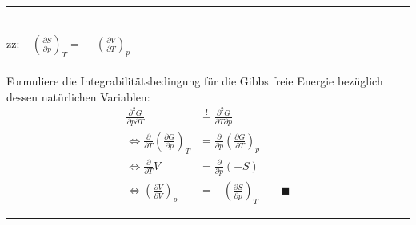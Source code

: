 \documentclass{article}
\newcommand{\lr}[1]{\left(#1\right)}
\begin{document}
\vspace{0.5cm}

{\color{violet}
\hrule
	\\
	zz: $- \lr{ \frac{\partial S}{\partial p} }_T = \phantom{-} \lr{ \frac{\partial V}{\partial T} }_p$\\
	\\
	Formuliere die Integrabilitätsbedingung für die Gibbs freie Energie bezüglich dessen natürlichen Variablen:
		\begin{align*}
			\frac{ \partial^2 G }{ \partial p \partial T } &\stackrel{!}{=} \frac{ \partial^2 G }{ \partial T \partial p } \\
			\Leftrightarrow \frac{\partial}{\partial T} \lr{ \frac{\partial G}{\partial p} }_T &= \frac{\partial}{\partial p} \lr{ \frac{\partial G}{\partial T} }_p \\
			\Leftrightarrow \frac{\partial}{\partial T} V &= \frac{\partial}{\partial p} (-S) \\
			\Leftrightarrow \lr{ \frac{\partial V}{\partial V} }_p &= -\lr{ \frac{\partial S}{\partial p} }_T \qquad \blacksquare
		\end{align*}
\hrule
}


\newpage
\end{document}
